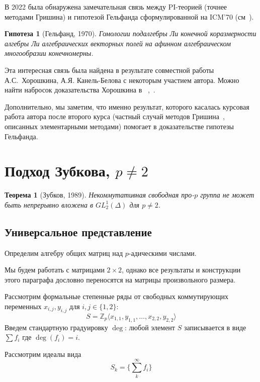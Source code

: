 \documentclass[12pt,a4paper]{article}
\newtheorem{theorem}{Теорема}[section]
\newtheorem{conjecture}{Гипотеза}[section]
\newcommand{\Z}{\ensuremath{\mathbb{Z}}}
\begin{document}
    В 2022 была обнаружена замечательная связь между PI-теорией (точнее методами Гришина) и гипотезой Гельфанда сформулированной на ICM’70 (см\ \cite{Gelfand}).
    \vskip 0.1in\noindent
    \begin{conjecture}[Гельфанд, 1970]\label{Gelfand}
        Гомологии подалгебры Ли конечной коразмерности алгебры Ли алгебраических векторных полей на афинном алгебраическом многообразии конечномерны.
    \end{conjecture}
    \vskip 0.1in\noindent
    Эта интересная связь была найдена в результате совместной работы А.С.\ Хорошкина, А.Я. Канель-Белова с некоторым участием автора.
    Можно найти набросок доказательства Хорошкина в ~\cite{Feigin-Kanel-Khoroshkin},~\cite{Centrone-Kanel-Khoroshkin-Vorobiov}.

    Дополнительно, мы заметим, что именно результат, которого касалась курсовая работа автора после второго курса (частный случай методов Гришина\ \cite{Grishin}, описанных элементарными методами) помогает в доказательстве гипотезы Гельфанда.


    \section{Подход Зубкова, $p\neq2$}
    \begin{theorem}[Зубков, 1989]
        \label{thm:Zubkov-main}
        Некоммутативная свободная про-$p$ группа не может быть непрерывно вложена в $GL^1_2(\Delta)$ для $p\neq 2$.
    \end{theorem}

    \subsection{Универсальное представление}
    Определим алгебру общих матриц над $p$-адическими числами.

    Мы будем работать с матрицами $2\times2$, однако все результаты и конструкции этого параграфа дословно переносятся на матрицы произвольного размера.

    Рассмотрим формальные степенные ряды от свободных коммутирующих переменных $x_{i,j}, y_{i,j}$ для $i,j \in \{ 1, 2 \}$:
    \[
        S = \Z_{p}\langle x_{1,1}, y_{1,1}, \ldots, x_{2,2}, y_{2,2} \rangle
    \]
    Введем стандартную градуировку $\deg$: любой элемент $S$ записывается в виде $\sum f_i$ где $\deg{(f_i)} = i$.

    Рассмотрим идеалы вида
    \[
        S_k = \{\sum\limits_k^{\infty} f_i \}
    \]
\end{document}
